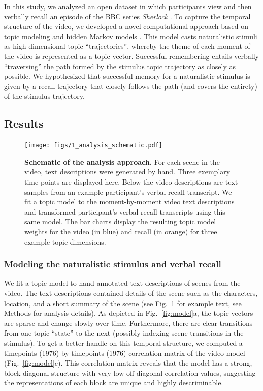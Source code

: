 \documentclass{article}
\begin{document}
{In this study, we analyzed an open dataset in which participants view and then verbally recall an episode of the BBC series \textit{Sherlock} \citep{ChenEtal17}. To capture the temporal structure of the video, we developed a novel computational approach based on topic modeling \citep{BleiEtal03} and hidden Markov models \citep{Rabi89, BaldEtal17}. This model casts naturalistic stimuli as high-dimensional topic ``trajectories'', whereby the theme of each moment of the video is represented as a topic vector. Successful remembering entails verbally ``traversing'' the path formed by the stimulus topic trajectory as closely as possible. We hypothesized that successful memory for a naturalistic stimulus is given by a recall trajectory that closely follows the path (and covers the entirety) of the stimulus trajectory.

\subsection{Results}

\begin{figure}[th!]
\centering
\texttt{[image: figs/1\_analysis\_schematic.pdf]}
\caption{\small \textbf{Schematic of the analysis approach.} For each scene in the video, text descriptions were generated by hand. Three exemplary time points are displayed here.  Below the video descriptions are text samples from an example participant's verbal recall transcript.  We fit a topic model to the moment-by-moment video text descriptions and transformed participant's verbal recall transcripts using this same model. The bar charts display the resulting topic model weights for the video (in blue) and recall (in orange) for three example topic dimensions.}
\label{fig:schematic}
\end{figure}

\subsubsection{Modeling the naturalistic stimulus and verbal recall}
We fit a topic model \citep{BleiEtal03} to hand-annotated text descriptions of scenes from the video. The text descriptions contained details of the scene such as the characters, location, and a short summary of the scene (see Fig.~\ref{fig:schematic} for example text, see Methods for analysis details). As depicted in Fig.~\ref{fig:model}a, the topic vectors are sparse and change slowly over time. Furthermore, there are clear transitions from one topic ``state'' to the next (possibly indexing scene transitions in the stimulus). To get a better handle on this temporal structure, we computed a timepoints (1976) by timepoints (1976) correlation matrix of the video model (Fig.~\ref{fig:model}c).  This correlation matrix reveals that the model has a strong, block-diagonal structure with very low off-diagonal correlation values, suggesting the representations of each block are unique and highly descriminable.

}
\end{document}
